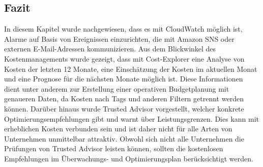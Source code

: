 \subsection*{Fazit}
In diesem Kapitel wurde nachgewiesen, dass es mit CloudWatch möglich ist, Alarme auf Basis von Ereignissen einzurichten, die mit Amazon SNS oder externen E-Mail-Adressen kommunizieren. %
Aus dem Blickwinkel des Kostenmanagements wurde gezeigt, dass mit Cost-Explorer eine Analyse von Kosten der letzten 12 Monate, eine Einschätzung der Kosten im aktuellen Monat und eine Prognose für die nächsten Monate möglich ist. Diese Informationen dient unter anderem zur Erstellung einer operativen Budgetplanung mit genaueren Daten, da
Kosten nach Tags und anderen Filtern getrennt werden können.
Darüber hinaus wurde Trusted Advisor vorgestellt, welcher konkrete Optimierungsempfehlungen gibt und warnt über Leistungsgrenzen. Dies kann mit erheblichen Kosten verbunden sein und ist daher nicht für alle Arten von Unternehmen unmittelbar attraktiv. Obwohl sich nicht alle Unternehmen die Prüfungen von Trusted Advisor leisten können, sollten die kostenlosen Empfehlungen im Überwachungs- und Optimierungsplan berücksichtigt werden.

